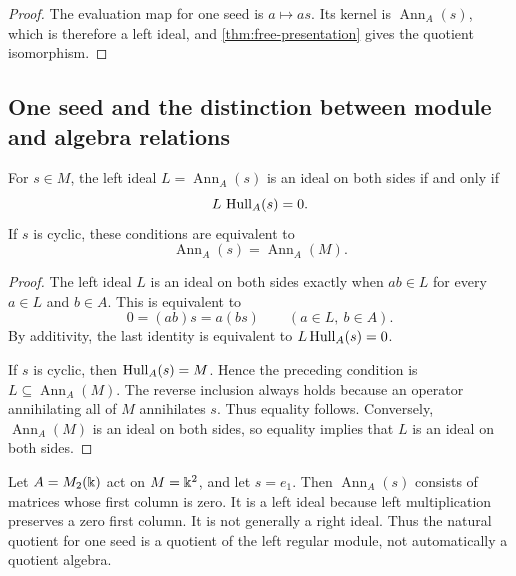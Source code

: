 \begin{proof}
The evaluation map for one seed is $a\mapsto as$.  Its kernel is $\operatorname{Ann}_A(s)$, which is therefore a left ideal, and \cref{thm:free-presentation} gives the quotient isomorphism.
\end{proof}

\subsection{One seed and the distinction between module and algebra relations}
\begin{proposition}
\label{prop:two-sided-annihilator}
For $s\in M$, the left ideal $L=\operatorname{Ann}_A(s)$ is an ideal on both sides if and only if
\[
L\,\operatorname{Hull}_A(s)=0.
\]
If $s$ is cyclic, these conditions are equivalent to
\[
\operatorname{Ann}_A(s)=\operatorname{Ann}_A(M).
\]
\end{proposition}

\begin{proof}
The left ideal $L$ is an ideal on both sides exactly when $ab\in L$ for every $a\in L$ and $b\in A$.  This is equivalent to
\[
0=(ab)s=a(bs)
\qquad(a\in L,\ b\in A).
\]
By additivity, the last identity is equivalent to $L\operatorname{Hull}_A(s)=0$.

If $s$ is cyclic, then $\operatorname{Hull}_A(s)=M$.  Hence the preceding condition is $L\subseteq\operatorname{Ann}_A(M)$.  The reverse inclusion always holds because an operator annihilating all of $M$ annihilates $s$.  Thus equality follows.  Conversely, $\operatorname{Ann}_A(M)$ is an ideal on both sides, so equality implies that $L$ is an ideal on both sides.
\end{proof}

\begin{microexample}[title={Why a seed annihilator need not be an ideal on both sides}]
Let \(A=M_2(\Bbbk)\) act on \(M=\Bbbk^2\), and let \(s=e_1\).  Then \(\operatorname{Ann}_A(s)\) consists of matrices whose first column is zero.  It is a left ideal because left multiplication preserves a zero first column.  It is not generally a right ideal.  Thus the natural quotient for one seed is a quotient of the left regular module, not automatically a quotient algebra.
\end{microexample}


